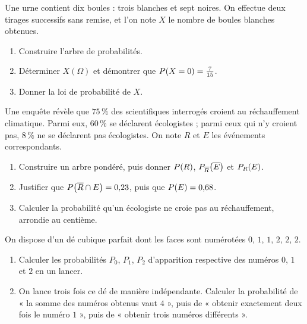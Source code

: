 \begin{annales}
Une urne contient dix boules : trois blanches et sept noires. On effectue deux
tirages successifs sans remise, et l'on note $X$ le nombre de boules blanches
obtenues.
\begin{enumerate}[label=\textbf{\alph*)}, leftmargin=*, itemsep=0.15em]
  \item Construire l'arbre de probabilités.
  \item Déterminer $X(\Omega)$ et démontrer que
        $\proba{X = 0} = \frac{7}{15}$.
  \item Donner la loi de probabilité de $X$.
\end{enumerate}

Une enquête révèle que $75\,\%$ des scientifiques interrogés croient au
réchauffement climatique. Parmi eux, $60\,\%$ se déclarent écologistes ; parmi
ceux qui n'y croient pas, $8\,\%$ ne se déclarent pas écologistes. On note $R$
et $E$ les événements correspondants.
\begin{enumerate}[label=\textbf{\alph*)}, leftmargin=*, itemsep=0.15em]
  \item Construire un arbre pondéré, puis donner $\proba{R}$,
        $\probacond{\evtc{E}}{\evtc{R}}$ et $\probacond{E}{R}$.
  \item Justifier que $\proba{\evtc{R} \cap E} = 0{,}23$, puis que
        $\proba{E} = 0{,}68$.
  \item Calculer la probabilité qu'un écologiste ne croie pas au
        réchauffement, arrondie au centième.
\end{enumerate}

On dispose d'un dé cubique parfait dont les faces sont numérotées $0$, $1$,
$1$, $2$, $2$, $2$.
\begin{enumerate}[label=\textbf{\alph*)}, leftmargin=*, itemsep=0.15em]
  \item Calculer les probabilités $P_{0}$, $P_{1}$, $P_{2}$ d'apparition
        respective des numéros $0$, $1$ et $2$ en un lancer.
  \item On lance trois fois ce dé de manière indépendante. Calculer la
        probabilité de « la somme des numéros obtenus vaut $4$ », puis de
        « obtenir exactement deux fois le numéro $1$ », puis de « obtenir
        trois numéros différents ».
\end{enumerate}


\end{annales}
